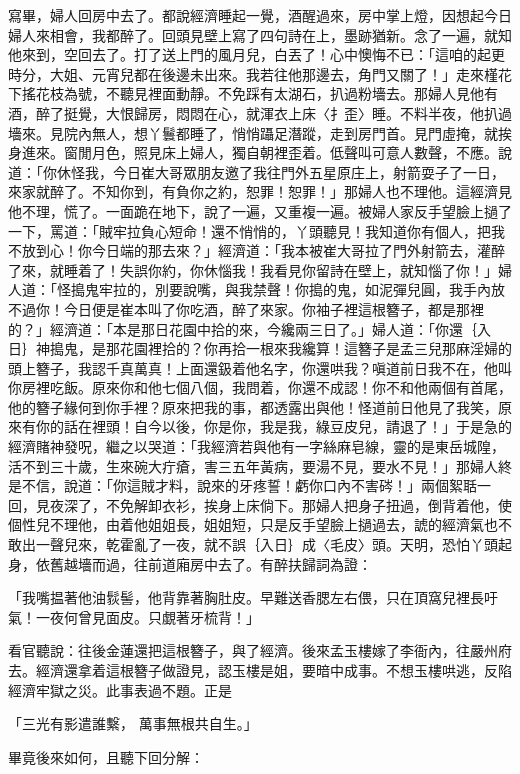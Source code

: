 寫畢，婦人回房中去了。都說經濟睡起一覺，酒醒過來，房中掌上燈，因想起今日婦人來相會，我都醉了。回頭見壁上寫了四句詩在上，墨跡猶新。念了一遍，就知他來到，空回去了。打了送上門的風月兒，白丟了！心中懊悔不已：「這咱的起更時分，大姐、元宵兒都在後邊未出來。我若往他那邊去，角門又關了！」走來槿花下搖花枝為號，不聽見裡面動靜。不免踩有太湖石，扒過粉墻去。那婦人見他有酒，醉了挺覺，大恨歸房，悶悶在心，就渾衣上床〈扌歪〉睡。不料半夜，他扒過墻來。見院內無人，想丫鬟都睡了，悄悄躡足潛蹤，走到房門首。見門虛掩，就挨身進來。窗閒月色，照見床上婦人，獨自朝裡歪着。低聲叫可意人數聲，不應。說道：「你休怪我，今日崔大哥眾朋友邀了我往門外五星原庄上，射箭耍子了一日，來家就醉了。不知你到，有負你之約，恕罪！恕罪！」那婦人也不理他。這經濟見他不理，慌了。一面跪在地下，說了一遍，又重複一遍。被婦人家反手望臉上撾了一下，罵道：「賊牢拉負心短命！還不悄悄的，丫頭聽見！我知道你有個人，把我不放到心！你今日端的那去來？」經濟道：「我本被崔大哥拉了門外射箭去，灌醉了來，就睡着了！失誤你約，你休惱我！我看見你留詩在壁上，就知惱了你！」婦人道：「怪搗鬼牢拉的，別要說嘴，與我禁聲！你搗的鬼，如泥彈兒圓，我手內放不過你！今日便是崔本叫了你吃酒，醉了來家。你袖子裡這根簪子，都是那裡的？」經濟道：「本是那日花園中拾的來，今纔兩三日了。」婦人道：「你還｛入日｝神搗鬼，是那花園裡拾的？你再拾一根來我纔算！這簪子是孟三兒那麻淫婦的頭上簪子，我認千真萬真！上面還鈒着他名字，你還哄我？嗔道前日我不在，他叫你房裡吃飯。原來你和他七個八個，我問着，你還不成認！你不和他兩個有首尾，他的簪子緣何到你手裡？原來把我的事，都透露出與他！怪道前日他見了我笑，原來有你的話在裡頭！自今以後，你是你，我是我，綠豆皮兒，請退了！」于是急的經濟賭神發呪，繼之以哭道：「我經濟若與他有一字絲麻皂線，靈的是東岳城隍，活不到三十歲，生來碗大疔瘡，害三五年黃病，要湯不見，要水不見！」那婦人終是不信，說道：「你這賊才料，說來的牙疼誓！虧你口內不害硶！」兩個絮聒一回，見夜深了，不免解卸衣衫，挨身上床倘下。那婦人把身子扭過，倒背着他，使個性兒不理他，由着他姐姐長，姐姐短，只是反手望臉上撾過去，諕的經濟氣也不敢出一聲兒來，乾霍亂了一夜，就不誤｛入日｝成〈毛皮〉頭。天明，恐怕丫頭起身，依舊越墻而過，往前道廂房中去了。有醉扶歸詞為證：

「我嘴揾著他油䯼髻，他背靠著胸肚皮。早難送香腮左右偎，只在頂窩兒裡長吁氣！一夜何曾見面皮。只覷著牙梳背！」

看官聽說：往後金蓮還把這根簪子，與了經濟。後來孟玉樓嫁了李衙內，往嚴州府去。經濟還拿着這根簪子做證見，認玉樓是姐，要暗中成事。不想玉樓哄逃，反陷經濟牢獄之災。此事表過不題。正是

「三光有影遣誰繫，  萬事無根共自生。」

畢竟後來如何，且聽下回分解：

